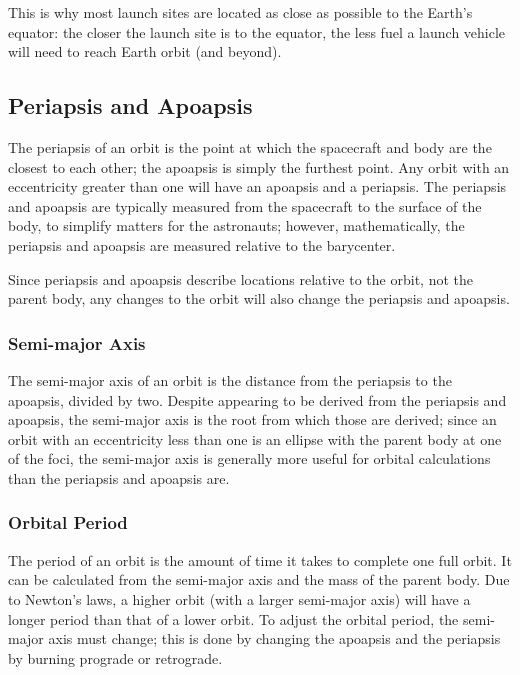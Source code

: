 
This is why most launch sites are located as close as possible to the
Earth's equator: the closer the launch site is to the equator, the
less fuel a launch vehicle will need to reach Earth orbit (and
beyond).

\subsection{Periapsis and Apoapsis}

The periapsis of an orbit is the point at which the spacecraft and
body are the closest to each other; the apoapsis is simply the
furthest point. Any orbit with an eccentricity greater than one will
have an apoapsis and a periapsis. The periapsis and apoapsis are
typically measured from the spacecraft to the surface of the body, to
simplify matters for the astronauts; however, mathematically, the
periapsis and apoapsis are measured relative to the barycenter.


Since periapsis and apoapsis describe locations relative to the orbit,
not the parent body, any changes to the orbit will also change the
periapsis and apoapsis.

\subsubsection{Semi-major Axis}

The semi-major axis of an orbit is the distance from the periapsis to
the apoapsis, divided by two. Despite appearing to be derived from the
periapsis and apoapsis, the semi-major axis is the root from which
those are derived; since an orbit with an eccentricity less than one
is an ellipse with the parent body at one of the foci, the semi-major
axis is generally more useful for orbital calculations than the
periapsis and apoapsis are.


\subsubsection{Orbital Period}

The period of an orbit is the amount of time it takes to complete one
full orbit. It can be calculated from the semi-major axis and the mass
of the parent body. Due to Newton's laws, a higher orbit (with a
larger semi-major axis) will have a longer period than that of a lower
orbit. To adjust the orbital period, the semi-major axis must change;
this is done by changing the apoapsis and the periapsis by burning
prograde or retrograde.

